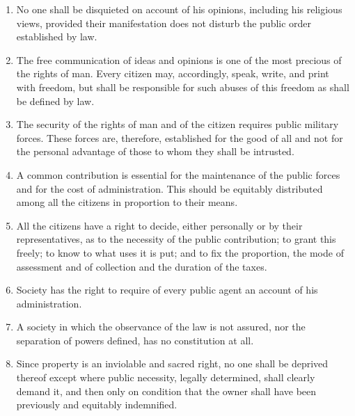 \documentclass[letterpaper,12pt]{article}
\begin{document}
\begin{enumerate}
  \item No one shall be disquieted on account of his opinions, including his religious views, provided their manifestation does not disturb the public order established by law.
  \item The free communication of ideas and opinions is one of the most precious of the rights of man. Every citizen may, accordingly, speak, write, and print with freedom, but shall be responsible for such abuses of this freedom as shall be defined by law.
  \item The security of the rights of man and of the citizen requires public military forces. These forces are, therefore, established for the good of all and not for the personal advantage of those to whom they shall be intrusted.
  \item A common contribution is essential for the maintenance of the public forces and for the cost of administration. This should be equitably distributed among all the citizens in proportion to their means.
  \item All the citizens have a right to decide, either personally or by their representatives, as to the necessity of the public contribution; to grant this freely; to know to what uses it is put; and to fix the proportion, the mode of assessment and of collection and the duration of the taxes.
  \item Society has the right to require of every public agent an account of his administration.
  \item A society in which the observance of the law is not assured, nor the separation of powers defined, has no constitution at all.
  \item Since property is an inviolable and sacred right, no one shall be deprived thereof except where public necessity, legally determined, shall clearly demand it, and then only on condition that the owner shall have been previously and equitably indemnified.
\end{enumerate}
\end{document}
